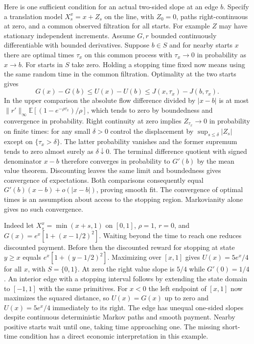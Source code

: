 \documentclass[11pt]{article}
\begin{document}
Here is one sufficient condition for an actual two-sided slope at an edge $b$. Specify a translation model $X_s^x=x+Z_s$ on the line, with $Z_0=0$, paths right-continuous at zero, and a common observed filtration for all starts. For example $Z$ may have stationary independent increments. Assume $G,r$ bounded continuously differentiable with bounded derivatives. Suppose $b\in S$ and for nearby starts $x$ there are optimal times $\tau_x$ on this common process with $\tau_x\to0$ in probability as $x\to b$. For starts in $S$ take zero. Holding a stopping time fixed now means using the same random time in the common filtration. Optimality at the two starts gives
\[
 G(x)-G(b)\le U(x)-U(b)\le J(x,\tau_x)-J(b,\tau_x).
\]
In the upper comparison the absolute flow difference divided by $|x-b|$ is at most $\|r'\|_\infty\mathbb E[(1-e^{-\rho\tau_x})/\rho]$, which tends to zero by boundedness and convergence in probability. Right continuity at zero implies $Z_{\tau_x}\to0$ in probability on finite times: for any small $\delta>0$ control the displacement by $\sup_{s\le\delta}|Z_s|$ except on $\{\tau_x>\delta\}$. The latter probability vanishes and the former supremum tends to zero almost surely as $\delta\downarrow0$. The terminal difference quotient with signed denominator $x-b$ therefore converges in probability to $G'(b)$ by the mean value theorem. Discounting leaves the same limit and boundedness gives convergence of expectations. Both comparisons consequently equal $G'(b)(x-b)+o(|x-b|)$, proving smooth fit. The convergence of optimal times is an assumption about access to the stopping region. Markovianity alone gives no such convergence.

Indeed let $X_s^x=\min(x+s,1)$ on $[0,1]$, $\rho=1$, $r=0$, and $G(x)=e^x[1+(x-1/2)^2]$. Waiting beyond the time to reach one reduces discounted payment. Before then the discounted reward for stopping at state $y\ge x$ equals $e^x[1+(y-1/2)^2]$. Maximizing over $[x,1]$ gives $U(x)=5e^x/4$ for all $x$, with $S=\{0,1\}$. At zero the right value slope is $5/4$ while $G'(0)=1/4$. An interior edge with a stopping interval follows by extending the state domain to $[-1,1]$ with the same primitives. For $x<0$ the left endpoint of $[x,1]$ now maximizes the squared distance, so $U(x)=G(x)$ up to zero and $U(x)=5e^x/4$ immediately to its right. The edge has unequal one-sided slopes despite continuous deterministic Markov paths and smooth payment. Nearby positive starts wait until one, taking time approaching one. The missing short-time condition has a direct economic interpretation in this example.
\end{document}

